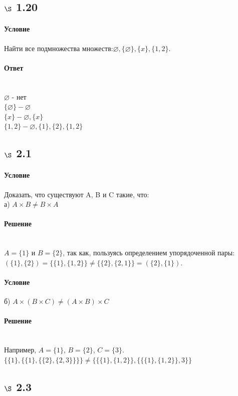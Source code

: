 \documentclass[a4paper,12pt]{article}
\begin{document}
\subsection*{$\S$ 1.20}
\paragraph*{Условие}
Найти все подмножества множеств:$\varnothing, \{ \varnothing \}, \{ x \}, \{1, 2\}. $
\paragraph*{Ответ} \mbox{}\\
$\varnothing $ - нет\\
$\{ \varnothing \} - \varnothing$\\
$\{ x \} - \varnothing, \{x\}$\\
$\{1, 2\} - \varnothing, \{1\}, \{2\}, \{1, 2\}$

\subsection*{$\S$ 2.1}
\paragraph*{Условие}
Доказать, что существуют A, B и C такие, что:\\
а) $A \times B \neq B \times A$
\paragraph*{Решение} \mbox{}\\
$A = \{1\}$ и $B = \{2\}$, так как, пользуясь определением упорядоченной пары: $ (\{1\},\{2\}) = \{\{1\},\{1,2\}\} \ne \{\{2\},\{2,1\}\} = (\{2\},\{1\})$.
\paragraph*{Условие}
б) $A \times (B \times C) \neq (A \times B) \times C$
\paragraph*{Решение} \mbox{}\\
Например, $A=\{1\}$, $B=\{2\}$, $C=\{3\}$.\\
$\{ \{1\}, \{ \{1\},\{ \{2\}, \{2,3\}\}\}\} \ne \{ \{\{1\}, \{1,2\} \}, \{\{\{1\}, \{1,2\} \},3\} \}$

\subsection*{$\S$ 2.3}
\end{document}
